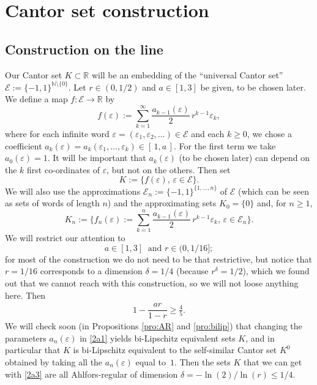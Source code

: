 \documentclass[10pt]{amsart}
\let\backslash\setminus
\numberwithin{equation}{section}
\theoremstyle{plain}
\theoremstyle{definition}
\newcommand{\R}{\mathbb{R}}
\newcommand{\bN}{\mathbb{N}}
\newcommand{\cE}{{\mathcal E}}
\begin{document}
\section{Cantor set construction}\label{sec:construct}

\subsection{Construction on the line}\label{sec:construct-line}

Our Cantor set $K \subset \R$ will be an embedding of the ``universal Cantor set''
$\cE :=\{-1,1\}^{\bN \backslash \{0\}}$.
Let $r \in (0, 1/2)$ and $a \in [1,3]$ be given, to be chosen later.
We define a map $f : \cE \to \R$ by
\begin{equation}\label{2a1}
f(\varepsilon):= \sum_{k=1}^\infty \dfrac{a_{k-1}(\varepsilon)}{2} \, r^{k-1} \varepsilon_k,
\end{equation}
where for each infinite word $\varepsilon= (\varepsilon_1,\varepsilon_2,\dots) \in \cE$ and each $k \geq 0$,
we chose a coefficient $a_k(\varepsilon)=a_k(\varepsilon_1,\dots,\varepsilon_{k}) \in [\,1, a\,]$.
For the first term we take $a_0(\varepsilon) = 1$.
It will be important that $a_k(\varepsilon)$ (to be chosen later) can depend on the $k$ first co-ordinates of
$\varepsilon$, but not on the others. Then set
\begin{equation}\label{eq:defK}
K:= \big \{ f(\varepsilon), \, \varepsilon\in \cE \big \}.
\end{equation}
We will also use the approximations $\cE_n:= \{-1,1\}^{\{1,\dots,n\}}$
of $\cE$ (which can be seen as sets of words of length $n$) and the approximating sets $K_0 = \{0\}$ and,
for $n \geq 1$,
\[
K_n:= \Big \{ f_n(\varepsilon):=
\sum_{k=1}^{n} \dfrac{a_{k-1}(\varepsilon)}{2} \, r^{k-1} \varepsilon_k, \, \varepsilon\in \cE_n \Big \}.
\]
We will restrict our attention to
\begin{equation}\label{2a3}
a \in [1,3] \ \text{ and } r \in (0, 1/16];
\end{equation}
for most of the construction we do not need to be that restrictive, but notice that
$r=1/16$ corresponds to a dimension $\delta = 1/4$ (because $r^\delta = 1/2$), which
we found out that we cannot reach with this construction, so we will not loose anything here.
Then
\begin{align}\label{eq:condition-a}
1- \dfrac{ar}{1-r} \geq \frac45.
\end{align}
We will check soon (in Propositions \ref{pro:AR} and \ref{pro:bilip})
that changing the parameters $a_n(\varepsilon)$ in \eqref{2a1}
yields bi-Lipschitz equivalent sets $K$, and in particular that
$K$ is bi-Lipschitz equivalent to the self-similar Cantor set $K^0$ obtained by
taking all the $a_n(\varepsilon)$ equal to~$1$. Then the sets $K$ that we can get with \eqref{2a3}
are all Ahlfors-regular of dimension $\delta = -\ln(2)/\ln(r) \leq 1/4$.
\end{document}
